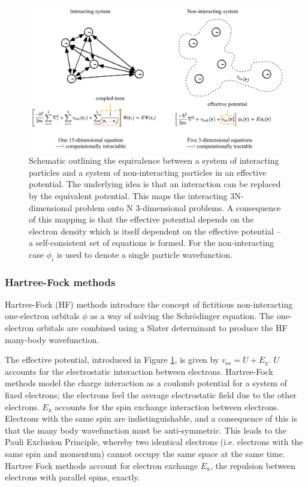\begin{figure}[h]
\centering
  \includegraphics[width=1.0\columnwidth]{figures/ch3/decouple.png}
  \caption[Interacting and non-interacting particle systems]{Schematic outlining the equivalence between a system of interacting particles and a system of non-interacting particles in an effective potential. The underlying idea is that an interaction can be replaced by the equivalent potential. This maps the interacting 3N-dimensional problem onto N 3-dimensional problems. A consequence of this mapping is that the effective potential depends on the electron density which is itself dependent on the effective potential -- a self-consistent set of equations is formed. For the non-interacting case $\phi_i$ is used to denote a single particle wavefunction.} %
  \label{decouple}
\end{figure}

\subsubsection{Hartree-Fock methods}

Hartree-Fock (HF) methods introduce the concept of fictitious non-interacting one-electron orbitals $\phi$ as a way of solving the Schr\"{o}dinger equation. The one-electron orbitals are combined using a Slater determinant to produce the HF many-body wavefunction.\autocite{Burke2007} 

The effective potential, introduced in Figure \ref{decouple}, is given by $v_{\textrm{ee}} = U + E_{\mathrm{x}}$. $U$ accounts for the electrostatic interaction between electrons. Hartree-Fock methods model the charge interaction as a coulomb potential for a system of fixed electrons; the electrons feel the average electrostatic field due to the other electrons.
$E_\mathrm{x}$ accounts for the spin exchange interaction between electrons.
Electrons with the same spin are indistinguishable, and a consequence of this is that the many body wavefunction must be anti-symmetric. This leads to the Pauli Exclusion Principle, whereby two identical electrons (i.e. electrons with the same spin and momentum) cannot occupy the same space at the same time.
Hartree Fock methods account for electron exchange $E_\mathrm{x}$, the repulsion between electrons with parallel spins, exactly. 

